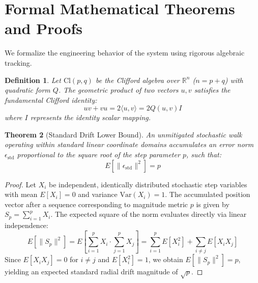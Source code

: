 \documentclass[11pt,fleqn]{article}
\newtheorem{theorem}{Theorem}
\newtheorem{definition}[theorem]{Definition}
\begin{document}
\section{Formal Mathematical Theorems and Proofs}
We formalize the engineering behavior of the system using rigorous algebraic tracking.

\begin{definition}
Let $\text{Cl}(p,q)$ be the Clifford algebra over $\mathbb{R}^n$ ($n = p+q$) with quadratic form $Q$. The geometric product of two vectors $u, v$ satisfies the fundamental Clifford identity:
\begin{equation}
u v + v u = 2 \langle u, v \rangle = 2 Q(u, v) I
\end{equation}
where $I$ represents the identity scalar mapping.
\end{definition}

\begin{theorem}[Standard Drift Lower Bound]
An unmitigated stochastic walk operating within standard linear coordinate domains accumulates an error norm $\epsilon_{\text{std}}$ proportional to the square root of the step parameter $p$, such that:
\begin{equation}
E\left[\|\epsilon_{\text{std}}\|^2\right] = p
\end{equation}
\end{theorem}
\begin{proof}
Let $X_i$ be independent, identically distributed stochastic step variables with mean $E[X_i] = 0$ and variance $\text{Var}(X_i) = 1$. The accumulated position vector after a sequence corresponding to magnitude metric $p$ is given by $S_p = \sum_{i=1}^p X_i$. The expected square of the norm evaluates directly via linear independence:
\begin{equation}
E\left[\|S_p\|^2\right] = E\left[\sum_{i=1}^p X_i \cdot \sum_{j=1}^p X_j\right] = \sum_{i=1}^p E\left[X_i^2\right] + \sum_{i \neq j} E\left[X_i X_j\right]
\end{equation}
Since $E\left[X_i X_j\right] = 0$ for $i \neq j$ and $E\left[X_i^2\right] = 1$, we obtain $E\left[\|S_p\|^2\right] = p$, yielding an expected standard radial drift magnitude of $\sqrt{p}$.
\end{proof}
\end{document}
